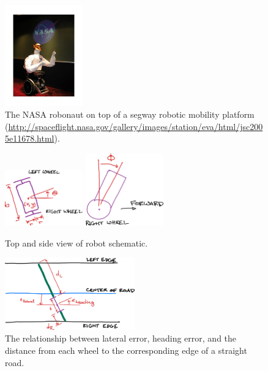 \documentclass[conf]{new-aiaa}
\begin{document}
\begin{figure}[p]
\begin{center}
\includegraphics[width=0.3\textwidth]{robonaut}
\caption{The NASA robonaut on top of a segway robotic mobility platform (\url{http://spaceflight.nasa.gov/gallery/images/station/eva/html/jsc2005e11678.html}). \label{figRobonaut}}
\end{center}
\end{figure}

\begin{figure}
\begin{center}
\includegraphics[width=0.3\textwidth]{schematic-top}
\hspace{10em}
\includegraphics[width=0.3\textwidth]{schematic-side}
\caption{Top and side view of robot schematic.}
\label{figSchematic}
\end{center}
\end{figure}


\begin{figure}
\begin{center}
\includegraphics[width=0.5\textwidth]{distances}
\caption{The relationship between lateral error, heading error, and the distance from each wheel to the corresponding edge of a straight road.}
\label{figDistances}
\end{center}
\end{figure}
\end{document}
